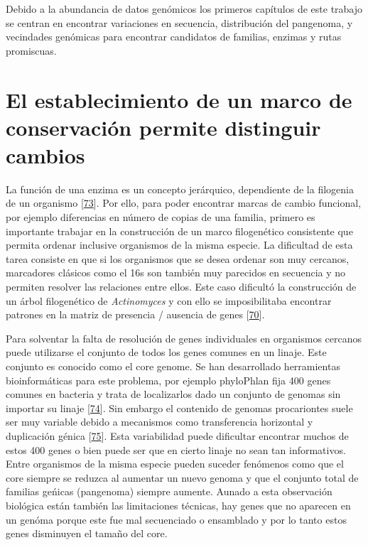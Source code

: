 \documentclass[12pt,twoside]{reedthesis}
\begin{document}
  Debido a la abundancia de datos genómicos los primeros capítulos de este
  trabajo se centran en encontrar variaciones en secuencia, distribución
  del pangenoma, y vecindades genómicas para encontrar candidatos de
  familias, enzimas y rutas promiscuas.\\
  
  \section{El establecimiento de un marco de conservación permite
  distinguir
  cambios}\label{el-establecimiento-de-un-marco-de-conservacion-permite-distinguir-cambios}
  
  La función de una enzima es un concepto jerárquico, dependiente de la
  filogenia de un organismo
  {[}\protect\hyperlink{ref-szklarczyk_string_2015}{73}{]}. Por ello, para
  poder encontrar marcas de cambio funcional, por ejemplo diferencias en
  número de copias de una familia, primero es importante trabajar en la
  construcción de un marco filogenético consistente que permita ordenar
  inclusive organismos de la misma especie. La dificultad de esta tarea
  consiste en que si los organismos que se desea ordenar son muy cercanos,
  marcadores clásicos como el 16s son también muy parecidos en secuencia y
  no permiten resolver las relaciones entre ellos. Este caso dificultó la
  construcción de un árbol filogenético de \emph{Actinomyces} y con ello
  se imposibilitaba encontrar patrones en la matriz de presencia /
  ausencia de genes
  {[}\protect\hyperlink{ref-juarez-vazquez_evolution_2017}{70}{]}.
  
  Para solventar la falta de resolución de genes individuales en
  organismos cercanos puede utilizarse el conjunto de todos los genes
  comunes en un linaje. Este conjunto es conocido como el core genome. Se
  han desarrollado herramientas bioinformáticas para este problema, por
  ejemplo phyloPhlan fija 400 genes comunes en bacteria y trata de
  localizarlos dado un conjunto de genomas sin importar su linaje
  {[}\protect\hyperlink{ref-segata_phylophlan_2013}{74}{]}. Sin embargo el
  contenido de genomas procariontes suele ser muy variable debido a
  mecanismos como transferencia horizontal y duplicación génica
  {[}\protect\hyperlink{ref-land_insights_2015}{75}{]}. Esta variabilidad
  puede dificultar encontrar muchos de estos 400 genes o bien puede ser
  que en cierto linaje no sean tan informativos. Entre organismos de la
  misma especie pueden suceder fenómenos como que el core siempre se
  reduzca al aumentar un nuevo genoma y que el conjunto total de familias
  geńicas (pangenoma) siempre aumente. Aunado a esta observación biológica
  están también las limitaciones técnicas, hay genes que no aparecen en un
  genóma porque este fue mal secuenciado o ensamblado y por lo tanto estos
  genes disminuyen el tamaño del core.
  
\end{document}
